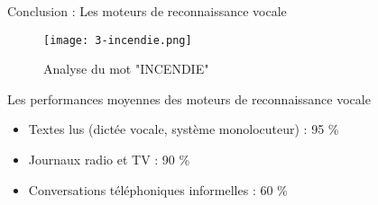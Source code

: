 \begin{frame}{Conclusion : Les moteurs de reconnaissance vocale}
	\begin{figure}
		\begin{center}
			\centering
			\texttt{[image: 3-incendie.png]}
			\caption{Analyse du mot "INCENDIE"}
		\end{center}
	\end{figure}

	\begin{exampleblock}{Les performances moyennes des moteurs de reconnaissance vocale}
		\begin{itemize}
			\item Textes lus (dictée vocale, système monolocuteur) : 95 \%
			\item Journaux radio et TV : 90 \%
			\item Conversations téléphoniques informelles : 60 \%
		\end{itemize}
	\end{exampleblock}
\end{frame}